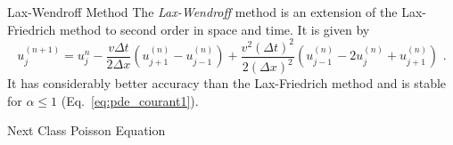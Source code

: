 \documentclass[11pt]{beamer}
\begin{document}
\begin{frame}[fragile]{Lax-Wendroff Method}
The \emph{Lax-Wendroff} method is an extension of the Lax-Friedrich method
to second order in space and time. It is given by
\begin{equation}
u_j^{(n+1)} = u_j^n - \frac{v\Delta t}{2\Delta x} \left(u_{j+1}^{(n)}
- u_{j-1}^{(n)} \right) + \frac{v^2(\Delta t)^2}{2(\Delta x)^2} \left(
u_{j-1}^{(n)} - 2 u_j^{(n)} + u_{j+1}^{(n)}\right)\,\,.
\end{equation}
It has considerably better accuracy than the Lax-Friedrich method and is
stable for $\alpha \le 1$ (Eq.~\ref{eq:pde_courant1}).
\end{frame}


\begin{frame}[fragile]{Next Class}
Poisson Equation
\end{frame}
\end{document}
